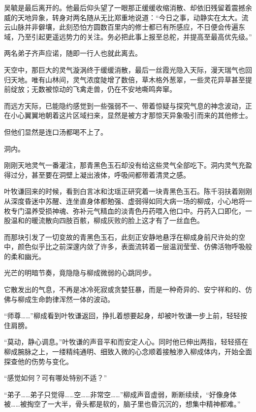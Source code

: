 吴毓是最后离开的。他最后仰头望了一眼那正缓缓收缩消散、却依旧残留着震撼余威的天地异象，转身对两名随从无比郑重地说道：“今日之事，动静实在太大。流云山脉并非僻壤，此刻恐怕方圆数百里内的修士都已有所感应，不日便会传遍东域，乃至引起更遥远势力的关注。务必把此事上报至总舵，并提高至最高优先级。”

两名弟子齐声应诺，随即一行人也就此离去。

\vspace{2em}

天空中，那巨大的灵气漩涡终于缓缓消散，最后一丝霞光隐入天际，漫天瑞气也回归天地。唯有山林间，灵气浓度陡增了数倍，草木格外葱翠，一些灵花异草甚至提前绽放；无数被惊动的飞禽走兽，仍在不安地嘶鸣奔窜。

而远方天际，已能隐约感觉到一些强弱不一、带着惊疑与探究气息的神念波动，正在小心翼翼地朝着这片区域扫来，显然是被方才那惊天异象吸引而来的其他修士。

但他们显然是连口汤都喝不上了。

\vspace{2em}

洞内。

刚刚天地灵气一番灌注，那青黑色玉石却没有给这些灵气全部吃下。洞内灵气充盈得过分，甚至要在洞壁上凝出液体，呼吸间都带着清灵之感。

叶牧谦回来的时候，看到白言冰和沈瑶正研究着一块青黑色玉石。陈千羽扶着刚刚从深度昏迷中苏醒、连坐直身体都勉强、虚弱得如同大病一场的柳成，小心地将一枚专门温养受损神魂、弥补元气精血的淡青色丹药喂入他口中。丹药入口即化，一股温和的暖流散向四肢百骸，柳成灰败的脸上这才有了一丝血色。

而那块引发了一切变故的青黑色玉石，此刻正安静地悬浮在柳成身前尺许处的空中，颜色似乎比之前深邃内敛了许多，表面流转着一层温润莹莹、仿佛活物呼吸般的柔和幽光。

光芒的明暗节奏，竟隐隐与柳成微弱的心跳同步。

它散发出的气息，不再是冰冷死寂或贪婪狂暴，而是一种奇异的、安宁祥和的、仿佛与柳成生命韵律浑然一体的波动。

“师尊……”柳成看到叶牧谦返回，挣扎着想要起身，却被叶牧谦一步上前，轻轻按住肩膀。

“莫动，静心调息。”叶牧谦的声音平和而安定人心。同时他已伸出两指，轻轻搭在柳成腕脉之上，一缕精纯通明、细致入微的心念顺着接触渗入柳成体内，开始全面探查他的伤势与变化。

“感觉如何？可有哪处特别不适？”

“弟子……弟子只觉得……空……非常空……”柳成声音虚弱，断断续续，“好像身体被……被掏空了一大半，骨头都是软的，脑子里也昏沉沉的，想集中精神都难。”

